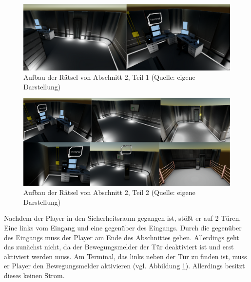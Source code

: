 \begin{figure}[ht]
\centering
\includegraphics[width=1\linewidth]{content/pictures/Rätseldesign - Abschnitt01 - Rätsel00.png}
\caption{Aufbau der Rätsel von Abschnitt 2, Teil 1 (Quelle: eigene Darstellung)}
\label{fig:riddle-design-section01-00}
\end{figure}

\begin{figure}[ht]
\centering
\includegraphics[width=1\linewidth]{content/pictures/Rätseldesign - Abschnitt01 - Rätsel01.png}
\caption{Aufbau der Rätsel von Abschnitt 2, Teil 2 (Quelle: eigene Darstellung)}
\label{fig:riddle-design-section01-01}
\end{figure}

Nachdem der Player in den Sicherheitsraum gegangen ist, stößt er auf 2 Türen. Eine links vom Eingang und eine gegenüber des Eingangs. Durch die gegenüber des Eingangs muss der Player am Ende des Abschnittes gehen. Allerdings geht das zunächst nicht, da der Bewegungsmelder der Tür deaktiviert ist und erst aktiviert werden muss. Am Terminal, das links neben der Tür zu finden ist, muss er Player den Bewegungsmelder aktivieren (vgl. Abbildung \ref{fig:riddle-design-section01-00}). Allerdings besitzt dieses keinen Strom. 

